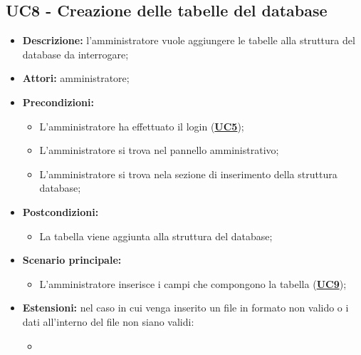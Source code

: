 \documentclass[5pt]{article}
\begin{document}
\subsection{UC8 - Creazione delle tabelle del database}
\label{sec:UC8}
\begin{itemize}
	\item \textbf{Descrizione:} l’amministratore vuole aggiungere le tabelle alla struttura del database da interrogare;
	\item \textbf{Attori:} amministratore;
	\item \textbf{Precondizioni:} 
	\begin{itemize}
		\item L’amministratore ha effettuato il login (\hyperref[sec:UC5]{\textbf{UC5}});
		\item L’amministratore si trova nel pannello amministrativo;
		\item L’amministratore si trova nela sezione di inserimento della struttura database;
	\end{itemize}
	\item \textbf{Postcondizioni:} 
	\begin{itemize}
		\item La tabella viene aggiunta alla struttura del database;
	\end{itemize}
	\item \textbf{Scenario principale:} 
	\begin{itemize}
		\item L’amministratore inserisce i campi che compongono la tabella (\hyperref[sec:UC9]{\textbf{UC9}});
	\end{itemize}
	\item \textbf{Estensioni:} nel caso in cui venga inserito un file in formato non valido o i dati all’interno del file non siano validi:
	\begin{itemize}
		\item
	\end{itemize}
\end{itemize}
\end{document}
